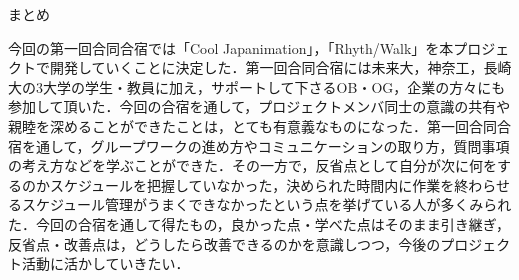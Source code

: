 \par
まとめ
\par
今回の第一回合同合宿では「Cool Japanimation」，「Rhyth/Walk」を本プロジェクトで開発していくことに決定した．第一回合同合宿には未来大，神奈工，長崎大の3大学の学生・教員に加え，サポートして下さるOB・OG，企業の方々にも参加して頂いた．今回の合宿を通して，プロジェクトメンバ同士の意識の共有や親睦を深めることができたことは，とても有意義なものになった．第一回合同合宿を通して，グループワークの進め方やコミュニケーションの取り方，質問事項の考え方などを学ぶことができた．その一方で，反省点として自分が次に何をするのかスケジュールを把握していなかった，決められた時間内に作業を終わらせるスケジュール管理がうまくできなかったという点を挙げている人が多くみられた．今回の合宿を通して得たもの，良かった点・学べた点はそのまま引き継ぎ，反省点・改善点は，どうしたら改善できるのかを意識しつつ，今後のプロジェクト活動に活かしていきたい．
